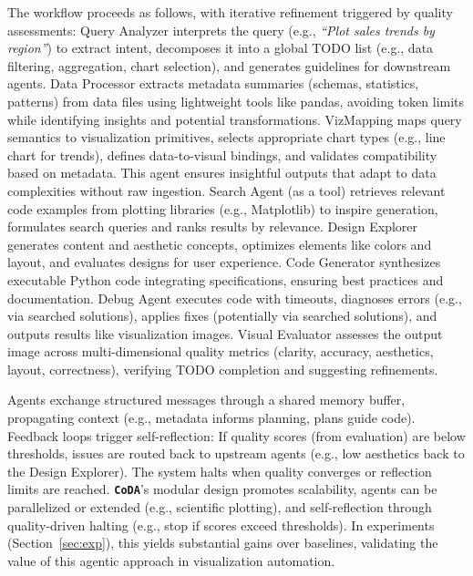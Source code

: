 \documentclass[11pt, a4paper, logo, copyright]{googlecloud}
\newcommand{\methodname}{\textbf{\texttt{\textcolor{StarIndigo}{C}\textcolor{StarIndigo}{o}\textcolor{StarCoral}{D}\textcolor{StarTeal}{A}}}}
\begin{document}
The workflow proceeds as follows, with iterative refinement triggered by quality assessments: Query Analyzer interprets the query (e.g., \textit{``Plot sales trends by region''}) to extract intent, decomposes it into a global TODO list (e.g., data filtering, aggregation, chart selection), and generates guidelines for downstream agents. Data Processor extracts metadata summaries (schemas, statistics, patterns) from data files using lightweight tools like pandas, avoiding token limits while identifying insights and potential transformations. 
VizMapping maps query semantics to visualization primitives, selects appropriate chart types (e.g., line chart for trends), defines data-to-visual bindings, and validates compatibility based on metadata. This agent ensures insightful outputs that adapt to data complexities without raw ingestion.
Search Agent (as a tool) retrieves relevant code examples from plotting libraries (e.g., Matplotlib) to inspire generation, formulates search queries and ranks results by relevance. Design Explorer generates content and aesthetic concepts, optimizes elements like colors and layout, and evaluates designs for user experience. Code Generator synthesizes executable Python code integrating specifications, ensuring best practices and documentation. Debug Agent executes code with timeouts, diagnoses errors (e.g., via searched solutions), applies fixes (potentially via searched solutions), and outputs results like visualization images. Visual Evaluator assesses the output image across multi-dimensional quality metrics (clarity, accuracy, aesthetics, layout, correctness), verifying TODO completion and suggesting refinements.

Agents exchange structured messages through a shared memory buffer, propagating context (e.g., metadata informs planning, plans guide code). Feedback loops trigger self-reflection: If quality scores (from evaluation) are below thresholds, issues are routed back to upstream agents (e.g., low aesthetics back to the Design Explorer). The system halts when quality converges or reflection limits are reached.
\methodname{}'s modular design promotes scalability, agents can be parallelized or extended (e.g., scientific plotting), and self-reflection through quality-driven halting (e.g., stop if scores exceed thresholds). In experiments (Section~\ref{sec:exp}), this yields substantial gains over baselines, validating the value of this agentic approach in visualization automation.
\end{document}

